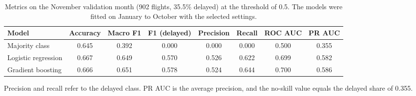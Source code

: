 \begin{table}[H]
  \centering
  \caption{Metrics on the November validation month (902 flights, 35.5\% delayed) at the threshold of 0.5. The models were fitted on January to October with the selected settings.}
  \label{tab:val_metrics}
  \footnotesize
  \setlength{\tabcolsep}{3pt}
  \begin{tabular*}{\textwidth}{@{\extracolsep{\fill}}lccccccc@{}}
    \toprule
    Model & Accuracy & Macro F1 & F1 (delayed) & Precision & Recall & ROC AUC & PR AUC \\
    \midrule
    Majority class & 0.645 & 0.392 & 0.000 & 0.000 & 0.000 & 0.500 & 0.355 \\
    Logistic regression & 0.667 & 0.649 & 0.570 & 0.526 & 0.622 & 0.699 & 0.582 \\
    Gradient boosting & 0.666 & 0.651 & 0.578 & 0.524 & 0.644 & 0.700 & 0.586 \\
    \bottomrule
  \end{tabular*}
  \par\smallskip
  {\footnotesize Precision and recall refer to the delayed class. PR AUC is the average precision, and the no-skill value equals the delayed share of 0.355.\par}
\end{table}
